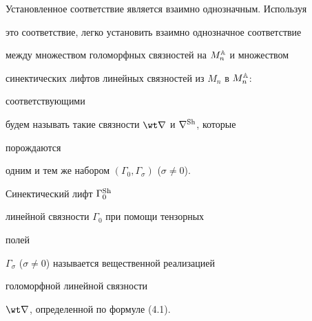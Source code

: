  


Установленное соответствие является взаимно однозначным. Используя 


это соответствие, легко установить взаимно однозначное соответствие 


между множеством голоморфных связностей на $M^{\Bbb A}_n$ и множеством 


синектических лифтов линейных связностей из $M_n$ в $M^{\Bbb A}_n$: 


соответствующими 


будем называть такие связности $\wt\nabla$ и $\nabla^{\operatorname{Sh}}$, которые 


порождаются  


одним и тем же набором $(\Gamma_0,\Gamma_\sigma)$ ($\sigma\ne 0$). 


 


 


\begin{defns} Синектический лифт $\Gamma^{\operatorname{Sh}}_0$


линейной связности $\Gamma_0$ при помощи тензорных 


полей 


$\Gamma_\sigma$ ($\sigma\ne 0$) называется вещественной реализацией 


голоморфной линейной связности  


$\wt\nabla$, определенной по формуле (4.1). 


\end{defns} 


 



